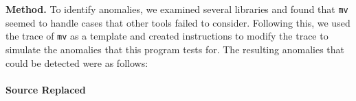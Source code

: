 
{\bf Method.}  To identify anomalies, 
we examined several libraries and found that {\tt mv} seemed
to handle cases that other tools failed to consider.  Following this, we 
used the trace of {\tt mv} as a template and created instructions to modify
the trace to simulate the anomalies that this program tests for.
The resulting anomalies that could be detected were as follows:


%

\paragraph{Source Replaced}

